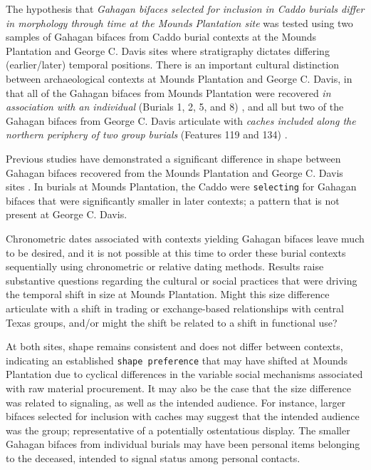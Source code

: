 \documentclass[]{interact}
\theoremstyle{plain}%
\theoremstyle{definition}
\theoremstyle{remark}
\begin{document}
The hypothesis that \emph{Gahagan bifaces selected for inclusion in
Caddo burials differ in morphology through time at the Mounds Plantation
site} was tested using two samples of Gahagan bifaces from Caddo burial
contexts at the Mounds Plantation and George C. Davis sites where
stratigraphy dictates differing (earlier/later) temporal positions.
There is an important cultural distinction between archaeological
contexts at Mounds Plantation and George C. Davis, in that all of the
Gahagan bifaces from Mounds Plantation were recovered \emph{in
association with an individual} (Burials 1, 2, 5, and 8) \citep{RN8174},
and all but two of the Gahagan bifaces from George C. Davis articulate
with \emph{caches included along the northern periphery of two group
burials} (Features 119 and 134) \citep{RN5746, RN8186}.

Previous studies have demonstrated a significant difference in shape
between Gahagan bifaces recovered from the Mounds Plantation and George
C. Davis sites \citep{RN8154}. In burials at Mounds Plantation, the
Caddo were \texttt{selecting} for Gahagan bifaces that were
significantly smaller in later contexts; a pattern that is not present
at George C. Davis.

Chronometric dates associated with contexts yielding Gahagan bifaces
leave much to be desired, and it is not possible at this time to order
these burial contexts sequentially using chronometric or relative dating
methods. Results raise substantive questions regarding the cultural or
social practices that were driving the temporal shift in size at Mounds
Plantation. Might this size difference articulate with a shift in
trading or exchange-based relationships with central Texas groups,
and/or might the shift be related to a shift in functional use?

At both sites, shape remains consistent and does not differ between
contexts, indicating an established \texttt{shape\ preference} that may
have shifted at Mounds Plantation due to cyclical differences in the
variable social mechanisms associated with raw material procurement. It
may also be the case that the size difference was related to signaling,
as well as the intended audience. For instance, larger bifaces selected
for inclusion with caches may suggest that the intended audience was the
group; representative of a potentially ostentatious display. The smaller
Gahagan bifaces from individual burials may have been personal items
belonging to the deceased, intended to signal status among personal
contacts.
\end{document}
